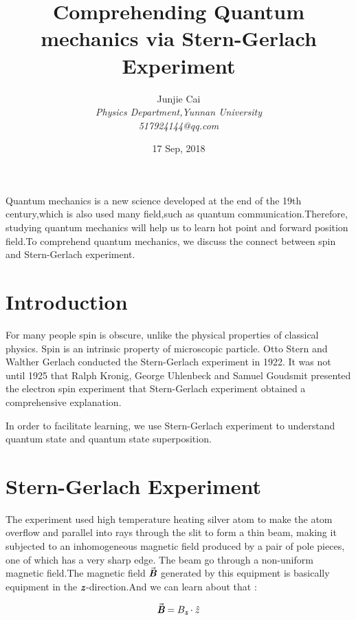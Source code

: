 \documentclass[a4paper]{article}
\def\mathbi#1{\textbf{\em #1}}
\begin{document}
\title{\textbf{Comprehending Quantum mechanics via Stern-Gerlach Experiment}}

\author{Junjie Cai\\\emph{Physics Department,Yunnan University}\\\emph{517924144@qq.com}}
\date{17 Sep, 2018}
\maketitle

Quantum mechanics is a new science developed at the end of the 19th century,which is also used many field,such as quantum communication.Therefore, studying quantum mechanics will help us to learn hot point and forward position field.To comprehend quantum mechanics, we discuss the connect between spin and Stern-Gerlach experiment.


\section{Introduction}
For many people spin is obscure, unlike the physical properties of classical physics. Spin is an intrinsic property of microscopic particle. Otto Stern and Walther Gerlach conducted the Stern-Gerlach experiment in 1922. It was not until 1925 that Ralph Kronig, George Uhlenbeck and Samuel Goudsmit presented the electron spin experiment that Stern-Gerlach experiment obtained a comprehensive explanation. 



In order to facilitate learning, we use Stern-Gerlach experiment to understand quantum state and quantum state superposition.

\section{Stern-Gerlach Experiment}
The experiment used high temperature heating silver atom to make the atom overflow and parallel into rays through the slit to form a thin beam, making it subjected to an inhomogeneous magnetic field produced by a pair of pole pieces, one of which has a very sharp edge. The beam go through a non-uniform magnetic field.The magnetic field $\vec{\mathbi{B}}$ generated by this equipment is basically equipment in the $\mathbi{z}$-direction.And we can learn about that :

\begin{equation} \vec{\mathbi{B}}=\textbf{$B_{\mathbi{z}}$}
\cdot \hat{z}
\end{equation} 
\end{document}
